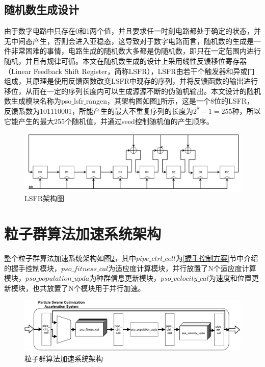 \subsection{随机数生成设计}
由于数字电路中只存在0和1两个值，并且要求任一时刻电路都处于确定的状态，并无中间态产生，否则会进入亚稳态，这导致对于数字电路而言，随机数的生成是一件非常困难的事情，电路生成的随机数大多都是伪随机数，即只在一定范围内进行随机，并且有规律可循。本文在随机数生成的设计上采用线性反馈移位寄存器（Linear Feedback Shift Register，简称LSFR），LSFR由若干个触发器和异或门组成，其原理是使用反馈函数改变LSFR中现存的序列，并将反馈函数的输出进行移位，从而在一定的序列长度内可以生成源源不断的伪随机输出。本文设计的随机数生成模块名称为pso$\_$lsfr$\_$rangen，其架构图如图\ref{fig:LSFR架构图}所示，这是一个8位的LSFR，反馈系数为101110001，所能产生的最大不重复序列的长度为$2^8-1=255$种，所以它能产生的最大255个随机值，并通过seed控制随机值的产生顺序。
\begin{figure}[htb]
    \centering
    \includegraphics[width=14cm]{fig/5-fig/LSFR架构图.pdf}
    \caption{LSFR架构图}
    \label{fig:LSFR架构图}
\end{figure}

\section{粒子群算法加速系统架构}
整个粒子群算法加速系统架构如图\ref{fig:粒子群算法加速系统架构示意图}，其中$pipe\_ctrl\_cell$为\ref{握手控制方案}节中介绍的握手控制模块，$pso\_fitness\_cal$为适应度计算模块，并行放置了N个适应度计算模块，$pso\_population\_upda$为种群信息更新模块，$pso\_velocity\_cal$为速度和位置更新模块，也共放置了N个模块用于并行加速。

\begin{figure}[htb]
    \centering
    \includegraphics[width=14cm]{fig/5-fig/粒子群算法加速系统架构.drawio.pdf}
    \caption{粒子群算法加速系统架构}
    \label{fig:粒子群算法加速系统架构示意图}
\end{figure}

